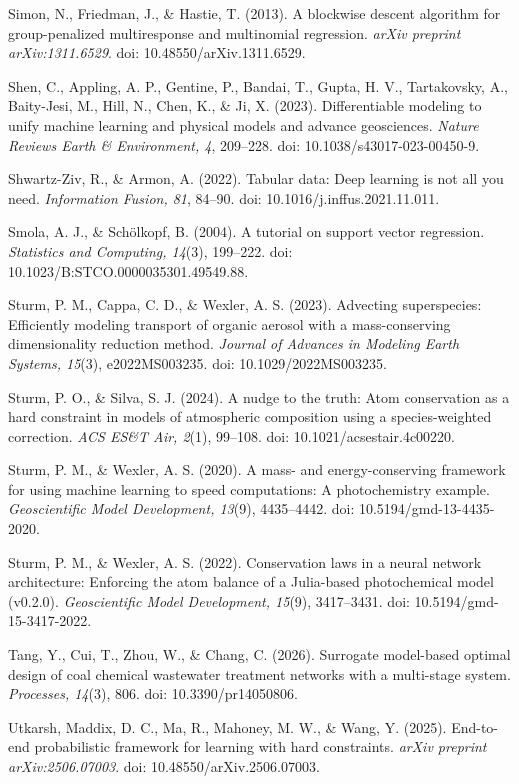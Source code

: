 \documentclass[a4paper,fleqn]{cas-sc}
\begin{document}
\noindent Simon, N., Friedman, J., \& Hastie, T. (2013). A blockwise descent algorithm for group-penalized multiresponse and multinomial regression. \textit{arXiv preprint arXiv:1311.6529}. doi: 10.48550/arXiv.1311.6529.

\noindent Shen, C., Appling, A. P., Gentine, P., Bandai, T., Gupta, H. V., Tartakovsky, A., Baity-Jesi, M., Hill, N., Chen, K., \& Ji, X. (2023). Differentiable modeling to unify machine learning and physical models and advance geosciences. \textit{Nature Reviews Earth \& Environment, 4}, 209--228. doi: 10.1038/s43017-023-00450-9.

\noindent Shwartz-Ziv, R., \& Armon, A. (2022). Tabular data: Deep learning is not all you need. \textit{Information Fusion, 81}, 84--90. doi: 10.1016/j.inffus.2021.11.011.

\noindent Smola, A. J., \& Sch\"olkopf, B. (2004). A tutorial on support vector regression. \textit{Statistics and Computing, 14}(3), 199--222. doi: 10.1023/B:STCO.0000035301.49549.88.

\noindent Sturm, P. M., Cappa, C. D., \& Wexler, A. S. (2023). Advecting superspecies: Efficiently modeling transport of organic aerosol with a mass-conserving dimensionality reduction method. \textit{Journal of Advances in Modeling Earth Systems, 15}(3), e2022MS003235. doi: 10.1029/2022MS003235.

\noindent Sturm, P. O., \& Silva, S. J. (2024). A nudge to the truth: Atom conservation as a hard constraint in models of atmospheric composition using a species-weighted correction. \textit{ACS ES\&T Air, 2}(1), 99--108. doi: 10.1021/acsestair.4c00220.

\noindent Sturm, P. M., \& Wexler, A. S. (2020). A mass- and energy-conserving framework for using machine learning to speed computations: A photochemistry example. \textit{Geoscientific Model Development, 13}(9), 4435--4442. doi: 10.5194/gmd-13-4435-2020.

\noindent Sturm, P. M., \& Wexler, A. S. (2022). Conservation laws in a neural network architecture: Enforcing the atom balance of a Julia-based photochemical model (v0.2.0). \textit{Geoscientific Model Development, 15}(9), 3417--3431. doi: 10.5194/gmd-15-3417-2022.

\noindent Tang, Y., Cui, T., Zhou, W., \& Chang, C. (2026). Surrogate model-based optimal design of coal chemical wastewater treatment networks with a multi-stage system. \textit{Processes, 14}(3), 806. doi: 10.3390/pr14050806.

\noindent Utkarsh, Maddix, D. C., Ma, R., Mahoney, M. W., \& Wang, Y. (2025). End-to-end probabilistic framework for learning with hard constraints. \textit{arXiv preprint arXiv:2506.07003}. doi: 10.48550/arXiv.2506.07003.
\end{document}
